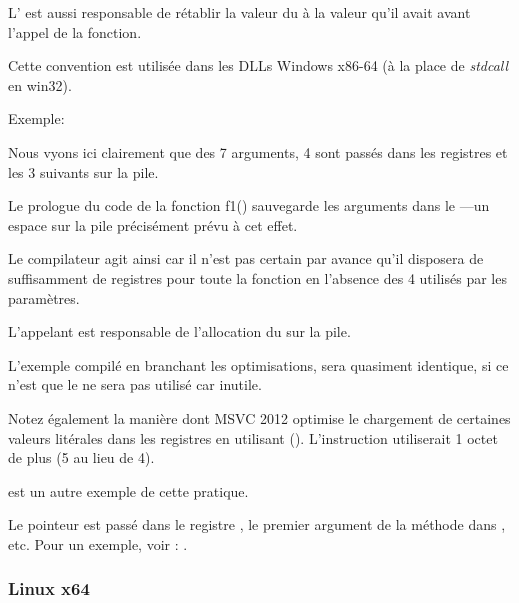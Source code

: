 L' est aussi responsable de rétablir la valeur du  à la valeur qu'il
avait avant l'appel de la fonction.

Cette convention est utilisée dans les DLLs Windows x86-64 (à la place de \emph{stdcall} en win32).

Exemple:






Nous vyons ici clairement que des 7 arguments, 4 sont passés dans les registres et les 3 suivants sur
la pile.

Le prologue du code de la fonction f1() sauvegarde les arguments dans le ---un espace
sur la pile précisément prévu à cet effet.

Le compilateur agit ainsi car il n'est pas certain par avance qu'il disposera de suffisamment de
registres pour toute la fonction en l'absence des 4 utilisés par les paramètres.

L'appelant est responsable de l'allocation du  sur la pile.



L'exemple compilé en branchant les optimisations, sera quasiment identique, si ce n'est que le
 ne sera pas utilisé car inutile.

\label{using_MOV_and_pack_of_LEA_to_load_values}

Notez également la manière dont MSVC 2012 optimise le chargement de certaines valeurs litérales dans
les registres en utilisant \LEA ().
L'instruction  utiliserait 1 octet de plus (5 au lieu de 4).

 est un autre exemple de cette pratique.


Le pointeur \ITthis est passé dans le registre \RCX, le premier argument de la méthode dans \RDX, etc.
Pour un exemple, voir : .

\subsubsection{Linux x64}

